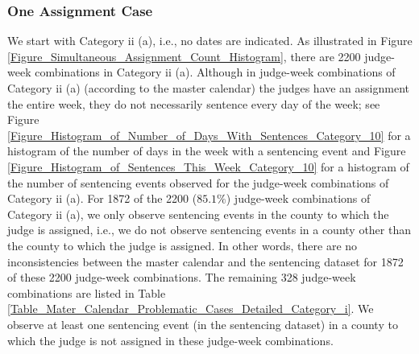 \documentclass[11pt, oneside]{article}   	%
\theoremstyle{ModifiedStyle}
\newtheorem{note}{Note}
\begin{document}
\subsubsection{One Assignment Case}
\label{Sec:Master_Calendar:Further_Analysis_of_Some_Assignments:Category_ii}
We start with Category ii (a), i.e., no dates are indicated. As illustrated in Figure \ref{Figure_Simultaneous_Assignment_Count_Histogram}, there are 2200 judge-week combinations in Category ii (a). Although in judge-week combinations of Category ii (a) (according to the master calendar) the judges have an assignment the entire week, they do not necessarily sentence every day of the week; see Figure \ref{Figure_Histogram_of_Number_of_Days_With_Sentences_Category_10} for a histogram of the number of days in the week with a sentencing event and Figure \ref{Figure_Histogram_of_Sentences_This_Week_Category_10} for a histogram of the number of sentencing events observed for the judge-week combinations of Category ii (a). For 1872 of the 2200 ($85.1\%$) judge-week combinations of Category ii (a), we only observe sentencing events in the county to which the judge is assigned, i.e., we do not observe sentencing events in a county other than the county to which the judge is assigned. In other words, there are no inconsistencies between the master calendar and the sentencing dataset for 1872 of these 2200 judge-week combinations. The remaining 328 judge-week combinations are listed in Table \ref{Table_Mater_Calendar_Problematic_Cases_Detailed_Category_i}. We observe at least one sentencing event (in the sentencing dataset) in a county to which the judge is not assigned in these judge-week combinations. %
\end{document}
